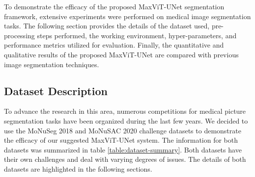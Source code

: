 \documentclass{article}
\begin{document}
To demonstrate the efficacy of the proposed MaxViT-UNet segmentation framework, extensive experiments were performed on medical image segmentation tasks. The following section provides the details of the dataset used, pre-processing steps performed, the working environment, hyper-parameters, and performance metrics utilized for evaluation. Finally, the quantitative and qualitative results of the proposed MaxViT-UNet are compared with previous image segmentation techniques.

\subsection{Dataset Description}\label{Dataset Description}

To advance the research in this area, numerous competitions for medical picture segmentation tasks have been organized during the last few years. We decided to use the MoNuSeg 2018 \cite{kumar2019multi} and MoNuSAC 2020 \cite{verma2021monusac2020} challenge datasets to demonstrate the efficacy of our suggested MaxViT-UNet system. The information for both datasets was summarized in table \ref{table:dataset-summary}. Both datasets have their own challenges and deal with varying degrees of issues. The details of both datasets are highlighted in the following sections.
\end{document}
